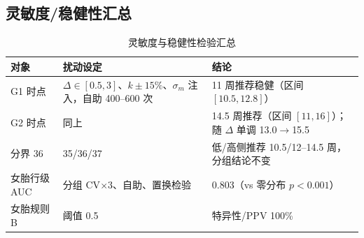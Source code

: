 \documentclass[11pt,a4paper]{ctexart}
\begin{document}
\subsection{灵敏度/稳健性汇总}
\begin{table}[H]
\centering\small
\caption{灵敏度与稳健性检验汇总}
\begin{tabular}{lp{5.9cm}p{6.1cm}}
\toprule
对象 & 扰动设定 & 结论\\
\midrule
G1 时点 & $\Delta\in[0.5,3]$、$k\pm15\%$、$\sigma_m$ 注入，自助 400--600 次 & 11 周推荐稳健（区间 $[10.5,12.8]$）\\
G2 时点 & 同上 & 14.5 周推荐（区间 $[11,16]$）；随 $\Delta$ 单调 13.0$\to$15.5\\
分界 36 & 35/36/37 & 低/高侧推荐 10.5/12--14.5 周，分组结论不变\\
女胎行级 AUC & 分组 CV$\times3$、自助、置换检验 & 0.803（vs 零分布 $p<0.001$）\\
女胎规则 B & 阈值 0.5 & 特异性/PPV 100\%\\
\bottomrule
\end{tabular}
\end{table}

\end{document}
